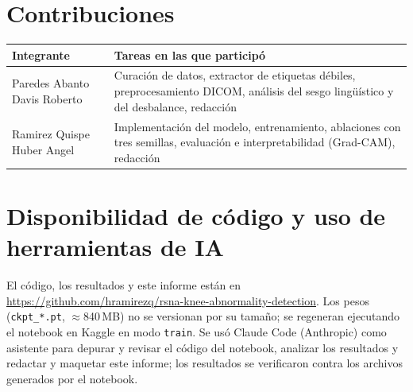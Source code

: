 \documentclass[conference]{IEEEtran}
\begin{document}
\section*{Contribuciones}

\begin{table}[h]
  \centering
  \footnotesize
  \begin{tabular}{@{}lp{}@{}}
    \toprule
    Integrante & Tareas en las que participó \\
    \midrule
    Paredes Abanto Davis Roberto & Curación de datos, extractor de etiquetas débiles, preprocesamiento DICOM, análisis del sesgo lingüístico y del desbalance, redacción \\
    Ramirez Quispe Huber Angel   & Implementación del modelo, entrenamiento, ablaciones con tres semillas, evaluación e interpretabilidad (Grad-CAM), redacción \\
    \bottomrule
  \end{tabular}
\end{table}

\section*{Disponibilidad de código y uso de herramientas de IA}

El código, los resultados y este informe están en \url{https://github.com/hramirezq/rsna-knee-abnormality-detection}.
Los pesos (\texttt{ckpt\_*.pt}, $\approx$840\,MB) no se versionan por su tamaño; se regeneran ejecutando el notebook en Kaggle en modo \texttt{train}.
Se usó Claude Code (Anthropic) como asistente para depurar y revisar el código del notebook, analizar los resultados y redactar y maquetar este informe; los resultados se verificaron contra los archivos generados por el notebook.



\end{document}
